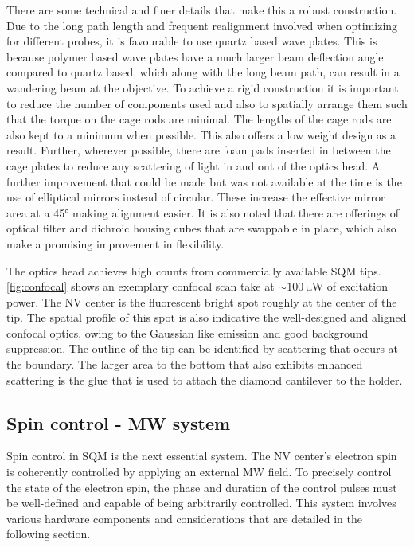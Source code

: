 There are some technical and finer details that make this a robust construction. Due to the long path length and frequent realignment involved when optimizing for different probes, it is favourable to use quartz based wave plates. This is because polymer based wave plates have a much larger beam deflection angle compared to quartz based, which along with the long beam path, can result in a wandering beam at the objective. To achieve a rigid construction it is important to reduce the number of components used and also to spatially arrange them such that the torque on the cage rods are minimal. The lengths of the cage rods are also kept to a minimum when possible. This also offers a low weight design as a result. Further, wherever possible, there are foam pads inserted in between the cage plates to reduce any scattering of light in and out of the optics head. A further improvement that could be made but was not available at the time is the use of elliptical mirrors instead of circular. These increase the effective mirror area at a \ang{45} making alignment easier. It is also noted that there are offerings of optical filter and dichroic housing cubes that are swappable in place, which also make a promising improvement in flexibility.

The optics head achieves high counts from commercially available \gls{SQM} tips. \cref{fig:confocal} shows an exemplary confocal scan take at $\sim\qty{100}{\micro\watt}$ of excitation power. The \gls{NV} center is the fluorescent bright spot roughly at the center of the tip. The spatial profile of this spot is also indicative the well-designed and aligned confocal optics, owing to the Gaussian like emission and good background suppression. The outline of the tip can be identified by scattering that occurs at the boundary. The larger area to the bottom that also exhibits enhanced scattering is the glue that is used to attach the diamond cantilever to the holder.

\subsection{Spin control - \gls{MW} system}
 Spin control in \gls{SQM} is the next essential system. The \gls{NV} center's electron spin is coherently controlled by applying an external \gls{MW} field. To precisely control the state of the electron spin, the phase and duration of the control pulses must be well-defined and capable of being arbitrarily controlled. This system involves various hardware components and considerations that are detailed in the following section.

